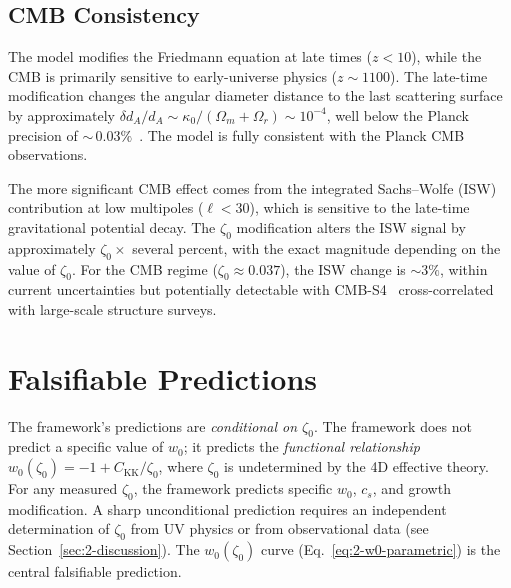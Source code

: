 \subsection{CMB Consistency}
\label{sec:2-CMB}

The model modifies the Friedmann equation at late times ($z < 10$), while the CMB is primarily sensitive to early-universe physics ($z \sim 1100$). The late-time modification changes the angular diameter distance to the last scattering surface by approximately $\delta d_A / d_A \sim \kappa_0/(\Omega_m + \Omega_r) \sim 10^{-4}$, well below the Planck precision of ${\sim}\,0.03\%$~\cite{ch2:Planck2018}. The model is fully consistent with the Planck CMB observations.

The more significant CMB effect comes from the integrated Sachs--Wolfe (ISW) contribution at low multipoles ($\ell < 30$), which is sensitive to the late-time gravitational potential decay. The $\zeta_0$ modification alters the ISW signal by approximately $\zeta_0 \times$ several percent, with the exact magnitude depending on the value of $\zeta_0$. For the CMB regime ($\zeta_0 \approx 0.037$), the ISW change is $\sim 3\%$, within current uncertainties but potentially detectable with CMB-S4~\cite{ch2:CMBS4} cross-correlated with large-scale structure surveys.

\section{Falsifiable Predictions}
\label{sec:2-predictions}

The framework's predictions are \emph{conditional on $\zeta_0$}. The framework does not predict a specific value of $w_0$; it predicts the \emph{functional relationship} $w_0(\zeta_0) = -1 + C_\mathrm{KK}/\zeta_0$, where $\zeta_0$ is undetermined by the 4D effective theory. For any measured $\zeta_0$, the framework predicts specific $w_0$, $c_s$, and growth modification. A sharp unconditional prediction requires an independent determination of $\zeta_0$ from UV physics or from observational data (see Section~\ref{sec:2-discussion}). The $w_0(\zeta_0)$ curve (Eq.~\ref{eq:2-w0-parametric}) is the central falsifiable prediction.

